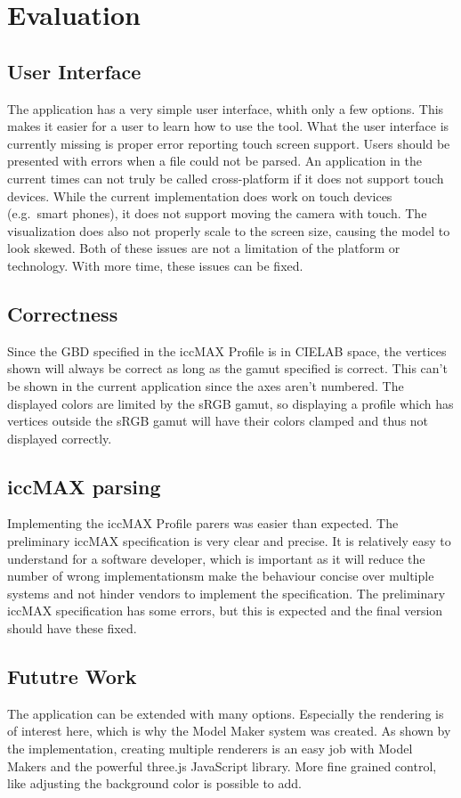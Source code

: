 \section{Evaluation}
\subsection{User Interface}
The application has a very simple user interface, whith only a few options.
This makes it easier for a user to learn how to use the tool.
What the user interface is currently missing is proper error reporting touch screen support.
Users should be presented with errors when a file could not be parsed.
An application in the current times can not truly be called cross-platform if it does not support touch devices.
While the current implementation does work on touch devices (e.g.\ smart phones), it does not support moving the camera with touch.
The visualization does also not properly scale to the screen size, causing the model to look skewed.
Both of these issues are not a limitation of the platform or technology.
With more time, these issues can be fixed.

\subsection{Correctness}
Since the GBD specified in the iccMAX Profile is in CIELAB space, the vertices shown will always be correct as long as the gamut specified is correct.
This can't be shown in the current application since the axes aren't numbered.
The displayed colors are limited by the sRGB gamut, so displaying a profile which has vertices outside the sRGB gamut will have their colors clamped and thus not displayed correctly.

\subsection{iccMAX parsing}
Implementing the iccMAX Profile parers was easier than expected.
The preliminary iccMAX specification is very clear and precise.
It is relatively easy to understand for a software developer, which is important as it will reduce the number of wrong implementationsm make the behaviour concise over multiple systems and not hinder vendors to implement the specification.
The preliminary iccMAX specification has some errors, but this is expected and the final version should have these fixed.

\subsection{Fututre Work}
The application can be extended with many options.
Especially the rendering is of interest here, which is why the Model Maker system was created.
As shown by the implementation, creating multiple renderers is an easy job with Model Makers and the powerful three.js JavaScript library.
More fine grained control, like adjusting the background color is possible to add.

